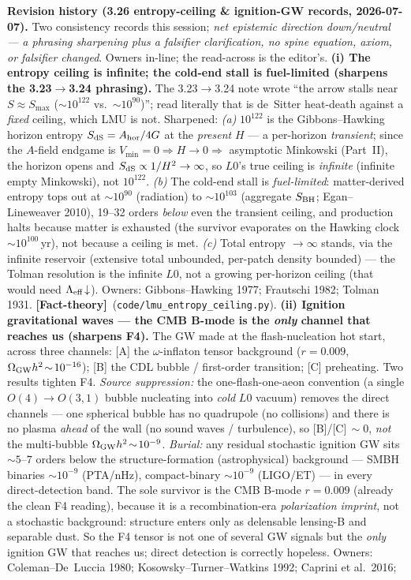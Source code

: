 \documentclass[11pt]{article}
\newcommand{\factth}{\textcolor{green!40!black}{\textbf{[Fact-theory]}}}
\begin{document}
{\smallskip\noindent\textbf{Revision history (3.26 entropy-ceiling \& ignition-GW records, 2026-07-07).} Two consistency records this session; \emph{net epistemic direction down/neutral --- a phrasing sharpening plus a falsifier clarification, no spine equation, axiom, or falsifier changed}. Owners in-line; the read-across is the editor's. \textbf{(i) The entropy ceiling is infinite; the cold-end stall is fuel-limited (sharpens the 3.23$\to$3.24 phrasing).} The 3.23$\to$3.24 note wrote ``the arrow stalls near $S\!\approx\!S_{\max}$ ($\sim\!10^{122}$ vs.\ $\sim\!10^{90}$)''; read literally that is de~Sitter heat-death against a \emph{fixed} ceiling, which LMU is not. Sharpened: \emph{(a)} $10^{122}$ is the Gibbons--Hawking horizon entropy $S_{\rm dS}=A_{\rm hor}/4G$ at the \emph{present} $H$ --- a per-horizon \emph{transient}; since the $A$-field endgame is $V_{\min}=0\Rightarrow H\to0\Rightarrow$ asymptotic Minkowski (Part~II), the horizon opens and $S_{\rm dS}\propto1/H^2\to\infty$, so $L0$'s true ceiling is \emph{infinite} (infinite empty Minkowski), not $10^{122}$. \emph{(b)} The cold-end stall is \emph{fuel-limited}: matter-derived entropy tops out at $\sim\!10^{90}$ (radiation) to $\sim\!10^{103}$ (aggregate $S_{\rm BH}$; Egan--Lineweaver 2010), 19--32 orders \emph{below} even the transient ceiling, and production halts because matter is exhausted (the survivor evaporates on the Hawking clock $\sim\!10^{100}$\,yr), not because a ceiling is met. \emph{(c)} Total entropy $\to\infty$ stands, via the infinite reservoir (extensive total unbounded, per-patch density bounded) --- the Tolman resolution is the infinite $L0$, not a growing per-horizon ceiling (that would need $\Lambda_{\rm eff}\!\downarrow$). Owners: Gibbons--Hawking 1977; Frautschi 1982; Tolman 1931. \factth\ (\texttt{code/lmu\_entropy\_ceiling.py}). \textbf{(ii) Ignition gravitational waves --- the CMB B-mode is the \emph{only} channel that reaches us (sharpens F4).} The GW made at the flash-nucleation hot start, across three channels: [A] the $\omega$-inflaton tensor background ($r\!=\!0.009$, $\Omega_{\rm GW}h^2\!\sim\!10^{-16}$); [B] the CDL bubble / first-order transition; [C] preheating. Two results tighten F4. \emph{Source suppression:} the one-flash-one-aeon convention (a single $O(4)\!\to\!O(3,1)$ bubble nucleating into \emph{cold} $L0$ vacuum) removes the direct channels --- one spherical bubble has no quadrupole (no collisions) and there is no plasma \emph{ahead} of the wall (no sound waves / turbulence), so [B]/[C]$\,\sim\!0$, \emph{not} the multi-bubble $\Omega_{\rm GW}h^2\!\sim\!10^{-9}$. \emph{Burial:} any residual stochastic ignition GW sits $\sim\!5$--$7$ orders below the structure-formation (astrophysical) background --- SMBH binaries $\sim\!10^{-9}$ (PTA/nHz), compact-binary $\sim\!10^{-9}$ (LIGO/ET) --- in every direct-detection band. The sole survivor is the CMB B-mode $r\!=\!0.009$ (already the clean F4 reading), because it is a recombination-era \emph{polarization imprint}, not a stochastic background: structure enters only as delensable lensing-B and separable dust. So the F4 tensor is not one of several GW signals but the \emph{only} ignition GW that reaches us; direct detection is correctly hopeless. Owners: Coleman--De~Luccia 1980; Kosowsky--Turner--Watkins 1992; Caprini et al.\ 2016; }
\end{document}

